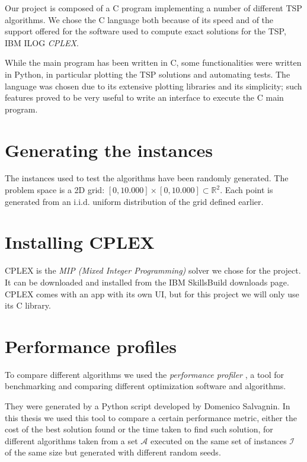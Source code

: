 Our project is composed of a C program implementing a number of different TSP algorithms. We chose the C language both because of its speed and of the support offered for the software used to compute exact solutions for the TSP, IBM ILOG \textit{CPLEX}.

While the main program has been written in C, some functionalities were written in Python, in particular plotting the TSP solutions and automating tests. The language was chosen due to its extensive plotting libraries and its simplicity; such features proved to be very useful to write an interface to execute the C main program.

\section{Generating the instances}

The instances used to test the algorithms have been randomly generated. The problem space is a 2D grid: $[0,10.000]\times[0,10.000]\subset\mathbb{R}^2$. Each point is generated from an i.i.d. uniform distribution of the grid defined earlier.

\section{Installing CPLEX}

CPLEX is the \textit{MIP (Mixed Integer Programming)} solver we chose for the project. It can be downloaded and installed from the IBM SkillsBuild downloads page. CPLEX comes with an app with its own UI, but for this project we will only use its C library. 

\section{Performance profiles}

To compare different algorithms we used the \textit{performance profiler} \cite{Dolan2002}, a tool for benchmarking and comparing different optimization software and algorithms.

They were generated by a Python script developed by Domenico Salvagnin. In this thesis we used this tool to compare a certain performance metric, either the cost of the best solution found or the time taken to find such solution, for different algorithms taken from a set $\mathcal{A}$ executed on the same set of instances $\mathcal{I}$ of the same size but generated with different random seeds.


